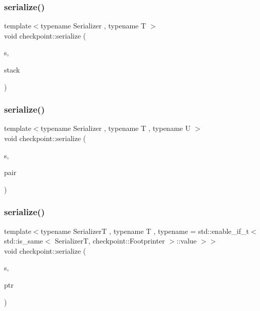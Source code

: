 \subsubsection{\texorpdfstring{serialize()}{serialize()}\hspace{0.1cm}{\footnotesize\ttfamily [11/29]}}
{\footnotesize\ttfamily template$<$typename Serializer , typename T $>$ \\
void checkpoint\+::serialize (\begin{DoxyParamCaption}\item[{\hyperlink{structcheckpoint_1_1_serializer}{Serializer} \&}]{s,  }\item[{const std\+::stack$<$ T $>$ \&}]{stack }\end{DoxyParamCaption})}

\mbox{\label{namespacecheckpoint_a7b5c3ff67d3f7b65cfb46da7617e87ad}} 
\subsubsection{\texorpdfstring{serialize()}{serialize()}\hspace{0.1cm}{\footnotesize\ttfamily [12/29]}}
{\footnotesize\ttfamily template$<$typename Serializer , typename T , typename U $>$ \\
void checkpoint\+::serialize (\begin{DoxyParamCaption}\item[{\hyperlink{structcheckpoint_1_1_serializer}{Serializer} \&}]{s,  }\item[{std\+::pair$<$ T, U $>$ \&}]{pair }\end{DoxyParamCaption})}

\mbox{\label{namespacecheckpoint_a5242b8701b19ff5eeb7587fb4a07bfe9}} 
\subsubsection{\texorpdfstring{serialize()}{serialize()}\hspace{0.1cm}{\footnotesize\ttfamily [13/29]}}
{\footnotesize\ttfamily template$<$typename SerializerT , typename T , typename  = std\+::enable\+\_\+if\+\_\+t$<$    std\+::is\+\_\+same$<$      Serializer\+T,      checkpoint\+::\+Footprinter    $>$\+::value  $>$$>$ \\
void checkpoint\+::serialize (\begin{DoxyParamCaption}\item[{SerializerT \&}]{s,  }\item[{T $\ast$}]{ptr }\end{DoxyParamCaption})}



